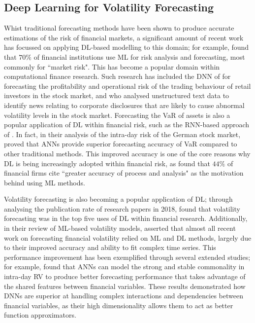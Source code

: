 \documentclass[a4paper, 11pt]{report}
\begin{document}
    \subsection{Deep Learning for Volatility Forecasting}

    Whist traditional forecasting methods have been shown to produce accurate estimations of the risk of financial markets, a significant amount of recent work has focussed on applying DL-based modelling to this domain; for example, \citet{chartis-2019} found that $70\%$ of financial institutions use ML for risk analysis and forecasting, most commonly for ``market risk". This has become a popular domain within computational finance research. Such research has included the DNN of \citet{kim-2020} for forecasting the profitability and operational risk of the trading behaviour of retail investors in the stock market, and \citet{groth-2011} who analysed unstructured text data to identify news relating to corporate disclosures that are likely to cause abnormal volatility levels in the stock market. Forecasting the VaR of assets is also a popular application of DL within financial risk, such as the RNN-based approach of \citet{arimond-2020}. In fact, in their analysis of the intra-day risk of the German stock market, \citet{sun-2009} proved that ANNs provide superior forecasting accuracy of VaR compared to other traditional methods. This improved accuracy is one of the core reasons why DL is being increasingly adopted within financial risk, as \citet{chartis-2019} found that $44\%$ of financial firms cite ``greater accuracy of process and analysis" as the motivation behind using ML methods.

    Volatility forecasting is also becoming a popular application of DL; through analysing the publication rate of research papers in 2018, \citet{sezer-2019} found that volatility forecasting was in the top five uses of DL within financial research. Additionally, in their review of ML-based volatility models, \citet{ge-2022} asserted that almost all recent work on forecasting financial volatility relied on ML and DL methods, largely due to their improved accuracy and ability to fit complex time series. This performance improvement has been exemplified through several extended studies; for example, \citet{zhang-2022} found that ANNs can model the strong and stable commonality in intra-day RV to produce better forecasting performance that takes advantage of the shared features between financial variables. These results demonstrated how DNNs are superior at handling complex interactions and dependencies between financial variables, as their high dimensionality allows them to act as better function approximators.
\end{document}
